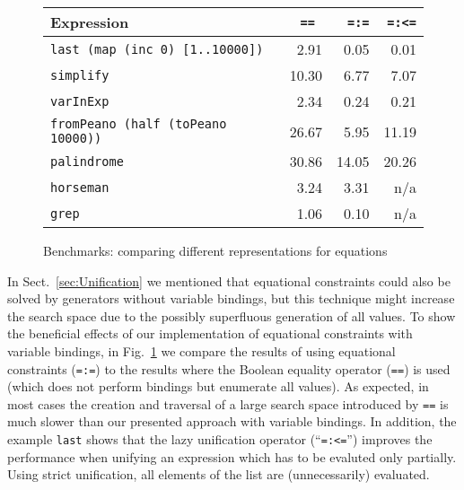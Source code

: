 \documentclass{llncs}
\newcommand{\code}[1]{\mbox{\small\texttt{#1}}}
\newcommand{\ccode}[1]{``\code{#1}''}
\begin{document}
\begin{figure}[t]
\centering
\begin{tabular}{|l|r|r|r|}
\hline
Expression                              & \code{==~}& \code{=:=}& \code{=:<=} \\
\hline
\code{last (map (inc 0) [1..10000])}   &  2.91   &    0.05   &    0.01   \\
\code{simplify}                         & 10.30      & 6.77      & 7.07        \\
\code{varInExp}                         & 2.34    & 0.24      & 0.21        \\
\code{fromPeano (half (toPeano 10000))} & 26.67     & 5.95      & 11.19       \\
\code{palindrome}                       & 30.86     & 14.05     & 20.26       \\
\code{horseman}                         & 3.24      & 3.31      & n/a         \\
\code{grep}                             & 1.06      & 0.10      & n/a         \\
\hline
\end{tabular}
\caption{Benchmarks: comparing different representations for equations}
 \label{fig:search-strategies}
\end{figure}

In Sect.~\ref{sec:Unification} we mentioned that equational
constraints could also be solved by generators without variable bindings,
but this technique might increase the search space due to the
possibly superfluous generation of all values.
To show the beneficial effects of our implementation
of equational constraints with variable bindings,
in Fig.~\ref{fig:search-strategies} we compare
the results of using equational constraints (\code{=:=})
to the results
where the Boolean equality operator (\code{==}) is used (which
does not perform bindings but enumerate all values).
As expected, in most cases the creation and traversal of a large
search space introduced by \code{==} is much slower than our
presented approach with variable bindings.
In addition, the example \code{last} shows that the lazy 
unification operator (\ccode{=:<=}) improves the performance when unifying an
expression which has to be evaluted only partially. Using strict unification,
all elements of the list are (unnecessarily) evaluated.
\end{document}
